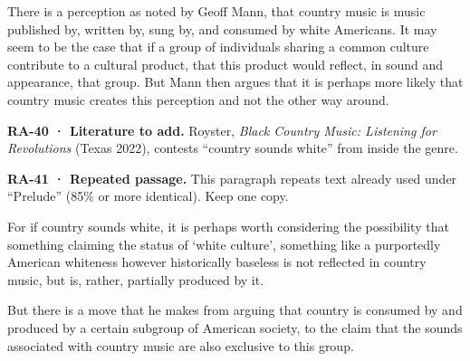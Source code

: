 \documentclass[
  letterpaper,
  DIV=11,
  numbers=noendperiod]{scrartcl}
\theoremstyle{remark}
\begin{document}
There is a perception as noted by Geoff Mann, that country music is
music published by, written by, sung by, and consumed by white
Americans. It may seem to be the case that if a group of individuals
sharing a common culture contribute to a cultural product, that this
product would reflect, in sound and appearance, that group. But Mann
then argues that it is perhaps more likely that country music creates
this perception and not the other way around.

\begin{tcolorbox}[enhanced jigsaw, arc=.35mm, bottomrule=.15mm, bottomtitle=1mm, breakable, colback=white, colbacktitle=quarto-callout-tip-color!10!white, colframe=quarto-callout-tip-color-frame, coltitle=black, left=2mm, leftrule=.75mm, opacityback=0, opacitybacktitle=0.6, rightrule=.15mm, title=\textcolor{quarto-callout-tip-color}{\faLightbulb}\hspace{0.5em}{Tip}, titlerule=0mm, toprule=.15mm, toptitle=1mm]

\textbf{RA-40 · Literature to add.} Royster, \emph{Black Country Music:
Listening for Revolutions} (Texas 2022), contests ``country sounds
white'' from inside the genre.

\end{tcolorbox}

\begin{tcolorbox}[enhanced jigsaw, arc=.35mm, bottomrule=.15mm, bottomtitle=1mm, breakable, colback=white, colbacktitle=quarto-callout-important-color!10!white, colframe=quarto-callout-important-color-frame, coltitle=black, left=2mm, leftrule=.75mm, opacityback=0, opacitybacktitle=0.6, rightrule=.15mm, title=\textcolor{quarto-callout-important-color}{\faExclamation}\hspace{0.5em}{Important}, titlerule=0mm, toprule=.15mm, toptitle=1mm]

\textbf{RA-41 · Repeated passage.} This paragraph repeats text already
used under ``Prelude'' (85\% or more identical). Keep one copy.

\end{tcolorbox}

For if country sounds white, it is perhaps worth considering the
possibility that something claiming the status of `white culture',
something like a purportedly American whiteness however historically
baseless is not reflected in country music, but is, rather, partially
produced by it.

But there is a move that he makes from arguing that country is consumed
by and produced by a certain subgroup of American society, to the claim
that the sounds associated with country music are also exclusive to this
group.
\end{document}
